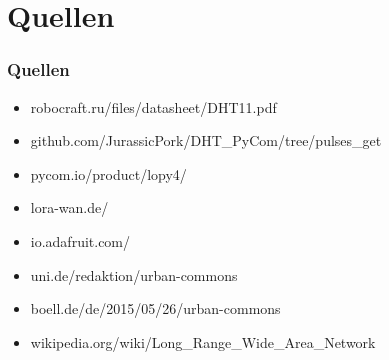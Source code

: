 \documentclass[12pt,utf8]{beamer}
\begin{document}
\section{Quellen}
\begin{frame}
\frametitle{Quellen}
\begin{itemize}
\item robocraft.ru/files/datasheet/DHT11.pdf
\item github.com/JurassicPork/DHT\_PyCom/tree/pulses\_get
\item pycom.io/product/lopy4/
\item lora-wan.de/
\item io.adafruit.com/
\item uni.de/redaktion/urban-commons
\item boell.de/de/2015/05/26/urban-commons
\item wikipedia.org/wiki/Long\_Range\_Wide\_Area\_Network
\end{itemize}
\end{frame}
\end{document}
